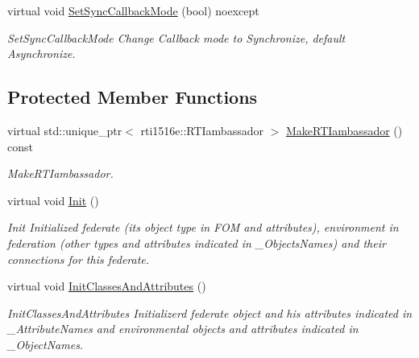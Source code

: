\begin{DoxyCompactItemize}
\mbox{\label{classUPIM_1_1UPIMFederate_a110e1b8913a712030a79d3299385a624}} 
virtual void \hyperlink{classUPIM_1_1UPIMFederate_a110e1b8913a712030a79d3299385a624}{Set\+Sync\+Callback\+Mode} (bool) noexcept
\begin{DoxyCompactList}\small\item\em Set\+Sync\+Callback\+Mode Change Callback mode to Synchronize, default Asynchronize. \end{DoxyCompactList}\end{DoxyCompactItemize}
\subsection*{Protected Member Functions}
\begin{DoxyCompactItemize}
\item 
virtual std\+::unique\+\_\+ptr$<$ rti1516e\+::\+R\+T\+Iambassador $>$ \hyperlink{classUPIM_1_1UPIMFederate_aae127e6a0ace96a0e5cce6d3eaaa1c65}{Make\+R\+T\+Iambassador} () const
\begin{DoxyCompactList}\small\item\em Make\+R\+T\+Iambassador. \end{DoxyCompactList}\item 
\mbox{\label{classUPIM_1_1UPIMFederate_aeb98defa41534c9ccdf3982dac9aeb59}} 
virtual void \hyperlink{classUPIM_1_1UPIMFederate_aeb98defa41534c9ccdf3982dac9aeb59}{Init} ()
\begin{DoxyCompactList}\small\item\em Init Initialized federate (it\textquotesingle{}s object type in F\+OM and attributes), environment in federation (other types and attributes indicated in \+\_\+\+Objects\+Names) and their connections for this federate. \end{DoxyCompactList}\item 
\mbox{\label{classUPIM_1_1UPIMFederate_aac73b4a4de4787004925b56730911ce8}} 
virtual void \hyperlink{classUPIM_1_1UPIMFederate_aac73b4a4de4787004925b56730911ce8}{Init\+Classes\+And\+Attributes} ()
\begin{DoxyCompactList}\small\item\em Init\+Classes\+And\+Attributes Initializerd federate object and his attributes indicated in \+\_\+\+Attribute\+Names and environmental objects and attributes indicated in \+\_\+\+Object\+Names. \end{DoxyCompactList}\item 

\end{DoxyCompactItemize}
